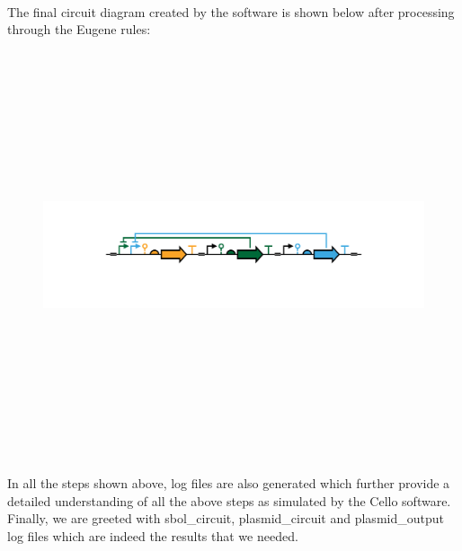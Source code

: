 \documentclass[11pt]{article}
\begin{document}
\\[\baselineskip]   
The final circuit diagram created by the software is shown below after processing through the Eugene rules:
\begin{figure}[ht!]
\centering
\includegraphics[width=12cm,height=12cm,keepaspectratio]{download (4).png}
\label{Case exmaple}
\end{figure}
In all the steps shown above, log files are also generated which further provide a detailed understanding of all the above steps as simulated by the Cello software. Finally, we are greeted with sbol_circuit, plasmid_circuit and plasmid_output log files which are indeed the results that we needed.
\end{document}
